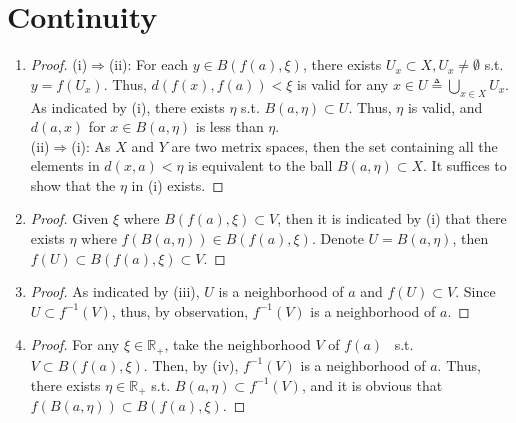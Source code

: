 \documentclass[paper=a4, fontsize=11pt]{scrartcl} %
\numberwithin{equation}{section} %
\numberwithin{figure}{section} %
\numberwithin{table}{section} %
\begin{document}
\section{Continuity}
	\begin{enumerate}
		\item
			\begin{proof}
				(i)$\Rightarrow$(ii): For each $ y \in B(f(a), \xi)$, there exists $U_x \subset X, U_x \neq \emptyset$ s.t. $y = f(U_x)$. Thus, $d(f(x), f(a)) < \xi$ is valid for any $x \in U \triangleq \bigcup\limits_{x \in X} U_x$. As indicated by (i), there exists $\eta$ s.t. $B(a, \eta) \subset U$. Thus, $\eta$ is valid, and $d(a, x)$ for $x \in B(a, \eta)$ is less than $\eta$.\\
				(ii)$\Rightarrow$(i): As $X$ and $Y$ are two metrix spaces, then the set containing all the elements in $d(x, a) < \eta$ is equivalent to the ball $B(a, \eta) \subset X$. It suffices to show that the $\eta$ in (i) exists.
			\end{proof}
		\item
			\begin{proof}
				Given $\xi$ where $B(f(a), \xi) \subset V$, then it is indicated by (i) that there exists $\eta$ where $f(B(a, \eta)) \in B(f(a), \xi)$. Denote $U = B(a, \eta)$, then $f(U) \subset B(f(a), \xi) \subset V$.
			\end{proof}
		\item
			\begin{proof}
				As indicated by (iii), $U$ is a neighborhood of $a$ and $f(U) \subset V$. Since $U \subset f^{-1}(V)$, thus, by observation, $f^{-1}(V)$ is a neighborhood of $a$. 
			\end{proof}
		\item
			\begin{proof}
				For any $\xi \in \mathbb{R}_+$, take the neighborhood $V$ of $f(a)$ \ s.t. $V \subset B(f(a), \xi)$. Then, by (iv), $f^{-1}(V)$ is a neighborhood of $a$. Thus, there exists $\eta \in \mathbb{R}_+$ s.t. $B(a, \eta) \subset f^{-1}(V)$, and it is obvious that $f(B(a, \eta)) \subset B(f(a), \xi)$.
			\end{proof}
	\end{enumerate}
\end{document}
